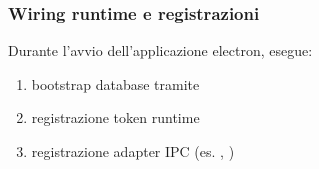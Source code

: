 \subsubsection{Wiring runtime e registrazioni}
\noindent
Durante l'avvio dell'applicazione electron,  esegue:

\begin{enumerate}[labelwidth=0.8cm,leftmargin=1cm]
    \item bootstrap database tramite 
    \item registrazione token runtime 
    \item registrazione adapter IPC (es. , )
\end{enumerate}
